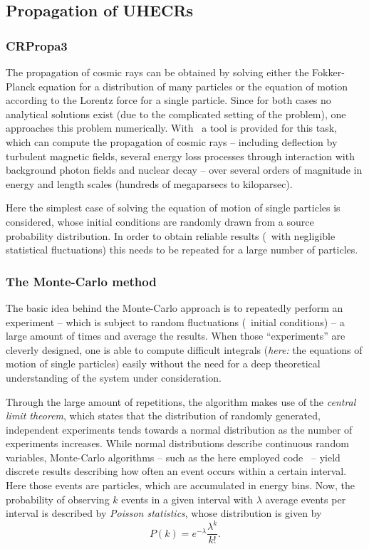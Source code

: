 \subsection{Propagation of UHECRs}
\subsubsection*{CRPropa3}
The propagation of cosmic rays can be obtained by solving either the
Fokker-Planck equation for a distribution of many particles
or the equation of motion according to the Lorentz force for a single particle.
Since for both cases no analytical solutions exist (due to the complicated
setting of the problem), one approaches this problem
numerically. With \CRPropa~a tool is provided for this task, which can compute
the propagation of cosmic rays -- including deflection by turbulent magnetic
fields, several energy loss processes through interaction with background
photon fields and nuclear decay -- over several orders of magnitude in energy
and length scales (hundreds of megaparsecs to kiloparsec).

Here the simplest case of solving the equation of motion of single particles is
considered, whose initial conditions are randomly drawn from a source probability
distribution. In order to obtain reliable results (\ie~with negligible
statistical fluctuations) this needs to be repeated for a large number of
particles.


\subsubsection*{The Monte-Carlo method}
The basic idea behind the Monte-Carlo approach is to repeatedly perform an
experiment -- which is subject to random fluctuations (\eg~initial
conditions) -- a large amount of times and average the results. When
those \enquote{experiments} are cleverly designed, one is able to compute
difficult integrals (\emph{here:} the equations of motion of single
particles) easily without the need for a deep theoretical understanding of
the system under consideration.

Through the large amount of repetitions, the algorithm makes use of the
\emph{central limit theorem}, which states that the distribution of randomly
generated, independent experiments tends towards a normal distribution as the
number of experiments increases.
While normal distributions describe continuous random variables, Monte-Carlo
algorithms -- such as the here employed code \CRPropa~-- yield discrete results
describing how often an event occurs within a certain interval. Here those
events are particles, which are accumulated in energy bins.
Now, the probability of observing $k$ events in a given interval with $\lambda$
average events per interval is described by \emph{Poisson statistics}, whose
distribution is given by
\begin{equation}
    P(k)=e^{-\lambda}\frac{\lambda^k}{k!}.
    \label{eq:poisson}
\end{equation}

